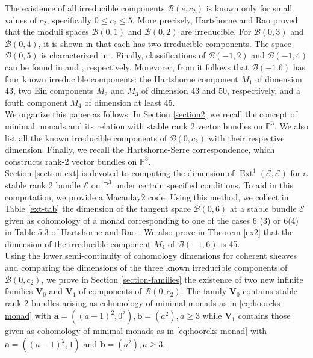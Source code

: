 \documentclass[twoside,reqno]{amsart}
\theoremstyle{plain}
\DeclareMathOperator{\Ext}{Ext}
\newcommand{\E}{\mathcal{E}}
\begin{document}
  The existence of all irreducible components $\mathcal{B}(e,c_2)$ is known only for small values of $c_2$, specifically 
  $0\leq c_2\leq5$. More precisely, Hartshorne and Rao \cite[Section 5.3]{HR91} proved that the moduli spaces $\mathcal{B}(0,1)$ and 
  $\mathcal{B}(0,2)$ are irreducible. For $\mathcal{B}(0,3)$ and $\mathcal{B}(0,4)$, it is shown in \cite{chang83,Eli81} that each has two irreducible components. The space $\mathcal{B}(0,5)$ is characterized in \cite{almeida21}. Finally, classifications of $\mathcal{B}(-1,2)$ and $\mathcal{B}(-1,4)$ can be found in \cite{HS81,M81} and \cite{BM85}, respectively. Morevorer, from \cite[Theorem 18]{MF2021} it follows that $\mathcal{B}(-1.6)$ has four known irreducible components: the Hartshorne component $M_1$ of dimension 43, two Ein components $M_2$ and $M_3$ of dimension 43 and 50, respectively, and a fouth component $M_4$ of dimension at least 45.  \\
  \indent We organize this paper as follows. In Section \ref{section2} we recall the concept of minimal monads and its relation with stable rank 2 vector bundles on $\mathbb{P}^3$. We also list all the known irreducible components of $\mathcal{B}(0,c_2)$  with their respective dimension. Finally, we recall the Hartshorne-Serre correspondence, which constructs rank-2 vector bundles on $\mathbb{P}^3$.\\
 \indent Section \ref{section-ext} is devoted to computing the dimension of $\Ext^1(\mathcal{E}, \mathcal{E})$ for a stable rank 2 bundle $\mathcal{E}$ on $\mathbb{P}^3$ under certain specified conditions. To aid in this computation, we provide a Macaulay2 code. Using this method, we collect in Table \ref{ext-tab} the dimension of the tangent space $\mathcal{B}(0,6)$ at a stable bundle $\E$ given as cohomology of a monad corresponding to one of the cases 6 (3) or 6(4) in Table 5.3 of Hartshorne and Rao \cite{HR91}. We also prove in Theorem \ref{ex2} that the dimension of the irreducible component $M_4$ of $\mathcal{B}(-1,6)$ is 45.\\
 \indent Using the lower semi-continuity of cohomology dimensions for coherent sheaves and comparing the dimensions 
 of the three known irreducible components of $\mathcal{B}(0,c_2)$, we prove in Section \ref{section-families} 
 the existence of two new infinite families $\mathbf{V}_0$ and $\mathbf{V}_1$ of components of $\mathcal{B}(0,c_2)$. The family $\mathbf{V}_0$ contains stable rank-2 bundles arising as cohomology of minimal monads as in \eqref{eq:hoorcks-monad} with $\boldsymbol{a}=({(a-1)}^2,0^2), \boldsymbol{b}=(a^2), a\geq3$ while $\mathbf{V}_1$ contains those given as cohomology of minimal monads as in \eqref{eq:hoorcks-monad} with $\boldsymbol{a}=({(a-1)}^2,1)$ 
 and $\boldsymbol{b}=(a^2), a\geq3$. 
 
\end{document}
